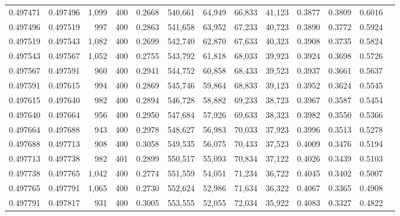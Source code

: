 \begin{tabular}{rrrrrrrrrrrrr}
0.497471 & 0.497496 &  1,099 & 400 &                                     0.2668 & 540,661 &  64,949 &  66,833 &  41,123 & 0.3877 & 0.3809 & 0.6016 \\
0.497496 & 0.497519 &    997 & 400 &                                     0.2863 & 541,658 &  63,952 &  67,233 &  40,723 & 0.3890 & 0.3772 & 0.5924 \\
0.497519 & 0.497543 &  1,082 & 400 &                                     0.2699 & 542,740 &  62,870 &  67,633 &  40,323 & 0.3908 & 0.3735 & 0.5824 \\
0.497543 & 0.497567 &  1,052 & 400 &                                     0.2755 & 543,792 &  61,818 &  68,033 &  39,923 & 0.3924 & 0.3698 & 0.5726 \\
0.497567 & 0.497591 &    960 & 400 &                                     0.2941 & 544,752 &  60,858 &  68,433 &  39,523 & 0.3937 & 0.3661 & 0.5637 \\
0.497591 & 0.497615 &    994 & 400 &                                     0.2869 & 545,746 &  59,864 &  68,833 &  39,123 & 0.3952 & 0.3624 & 0.5545 \\
0.497615 & 0.497640 &    982 & 400 &                                     0.2894 & 546,728 &  58,882 &  69,233 &  38,723 & 0.3967 & 0.3587 & 0.5454 \\
0.497640 & 0.497664 &    956 & 400 &                                     0.2950 & 547,684 &  57,926 &  69,633 &  38,323 & 0.3982 & 0.3550 & 0.5366 \\
0.497664 & 0.497688 &    943 & 400 &                                     0.2978 & 548,627 &  56,983 &  70,033 &  37,923 & 0.3996 & 0.3513 & 0.5278 \\
0.497688 & 0.497713 &    908 & 400 &                                     0.3058 & 549,535 &  56,075 &  70,433 &  37,523 & 0.4009 & 0.3476 & 0.5194 \\
0.497713 & 0.497738 &    982 & 401 &                                     0.2899 & 550,517 &  55,093 &  70,834 &  37,122 & 0.4026 & 0.3439 & 0.5103 \\
0.497738 & 0.497765 &  1,042 & 400 &                                     0.2774 & 551,559 &  54,051 &  71,234 &  36,722 & 0.4045 & 0.3402 & 0.5007 \\
0.497765 & 0.497791 &  1,065 & 400 &                                     0.2730 & 552,624 &  52,986 &  71,634 &  36,322 & 0.4067 & 0.3365 & 0.4908 \\
0.497791 & 0.497817 &    931 & 400 &                                     0.3005 & 553,555 &  52,055 &  72,034 &  35,922 & 0.4083 & 0.3327 & 0.4822 \\

\end{tabular}
